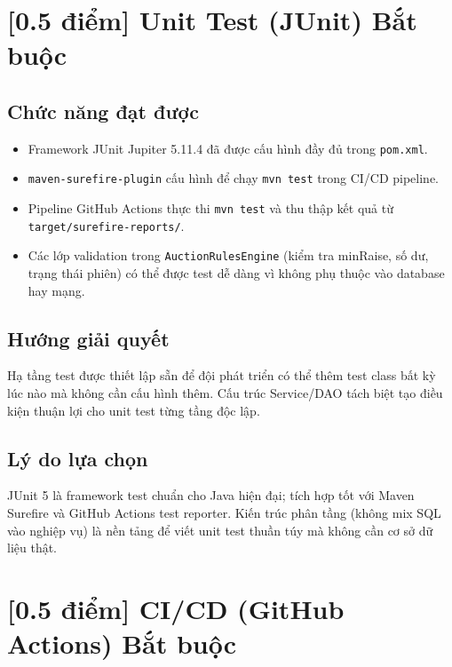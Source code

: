 \documentclass[12pt,a4paper]{article}
\newcommand{\score}[1]{\textbf{[#1 điểm]}}
\newcommand{\mandatory}{\textcolor{mandatorycolor}{\textbf{Bắt buộc}}}
\newcommand{\filepath}[1]{\texttt{\small #1}}
\begin{document}
\section{\score{0.5} Unit Test (JUnit) \hfill \mandatory}

\subsection*{Chức năng đạt được}

\begin{itemize}[leftmargin=1.5em]
  \item Framework JUnit Jupiter 5.11.4 đã được cấu hình đầy đủ trong \texttt{pom.xml}.
  \item \texttt{maven-surefire-plugin} cấu hình để chạy \texttt{mvn test} trong CI/CD pipeline.
  \item Pipeline GitHub Actions thực thi \texttt{mvn test} và thu thập kết quả từ \texttt{target/surefire-reports/}.
  \item Các lớp validation trong \filepath{AuctionRulesEngine} (kiểm tra minRaise, số dư, trạng thái phiên) có thể được test dễ dàng vì không phụ thuộc vào database hay mạng.
\end{itemize}

\subsection*{Hướng giải quyết}
Hạ tầng test được thiết lập sẵn để đội phát triển có thể thêm test class bất kỳ lúc nào mà không cần cấu hình thêm. Cấu trúc Service/DAO tách biệt tạo điều kiện thuận lợi cho unit test từng tầng độc lập.

\subsection*{Lý do lựa chọn}
JUnit 5 là framework test chuẩn cho Java hiện đại; tích hợp tốt với Maven Surefire và GitHub Actions test reporter. Kiến trúc phân tầng (không mix SQL vào nghiệp vụ) là nền tảng để viết unit test thuần túy mà không cần cơ sở dữ liệu thật.

\section{\score{0.5} CI/CD (GitHub Actions) \hfill \mandatory}
\end{document}
